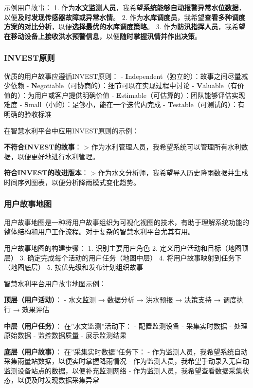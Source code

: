 示例用户故事： 1.
作为\textbf{水文监测人员}，我希望\textbf{系统能够自动报警异常水位数据}，以便\textbf{及时发现传感器故障或异常水情}。
2.
作为\textbf{水库调度员}，我希望\textbf{查看多种调度方案的对比分析}，以便\textbf{选择最优的水库调度策略}。
3.
作为\textbf{防汛指挥人员}，我希望\textbf{在移动设备上接收洪水预警信息}，以便\textbf{随时掌握汛情并作出决策}。

\subsubsection{INVEST原则}\label{investux539fux5219}

优质的用户故事应遵循INVEST原则： -
\textbf{I}ndependent（独立的）：故事之间尽量减少依赖 -
\textbf{N}egotiable（可协商的）：细节可以在实现过程中讨论 -
\textbf{V}aluable（有价值的）：为用户或客户提供明确价值 -
\textbf{E}stimable（可估算的）：团队能够评估实现难度 -
\textbf{S}mall（小的）：足够小，能在一个迭代内完成 -
\textbf{T}estable（可测试的）：有明确的验收标准

在智慧水利平台中应用INVEST原则的示例：

\textbf{不符合INVEST的故事}： \textgreater{}
作为水利管理人员，我希望系统可以管理所有水利数据，以便更好地进行水利管理。

\textbf{符合INVEST的改进版本}： \textgreater{}
作为水文分析师，我希望导入历史降雨数据并生成时间序列图表，以便分析降雨模式变化趋势。

\subsubsection{用户故事地图}\label{ux7528ux6237ux6545ux4e8bux5730ux56fe}

用户故事地图是一种将用户故事组织为可视化视图的技术，有助于理解系统功能的整体结构和用户工作流程。对于复杂的智慧水利平台尤其有用。

用户故事地图的构建步骤： 1. 识别主要用户角色 2.
定义用户活动和目标（地图顶层） 3. 确定完成每个活动的用户任务（地图中层）
4. 将用户故事映射到任务下（地图底层） 5. 按优先级和发布计划组织故事

智慧水利平台用户故事地图示例：

\textbf{顶层（用户活动）}： - 水文监测 → 数据分析 → 洪水预报 → 决策支持
→ 调度执行 → 效果评估

\textbf{中层（用户任务）}： 在''水文监测''活动下： - 配置监测设备 -
采集实时数据 - 处理原始数据 - 监控数据质量 - 展示监测结果

\textbf{底层（用户故事）}： 在''采集实时数据''任务下： -
作为监测人员，我希望系统自动采集雨量站数据，以便实时掌握降雨情况 -
作为监测人员，我希望手动录入无自动监测设备站点的数据，以便补充监测网络 -
作为监测人员，我希望查看数据采集状态，以便及时发现数据采集异常

